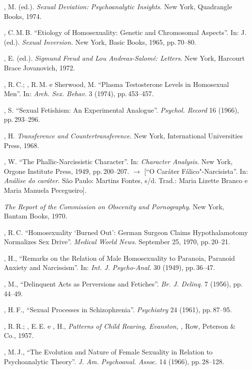 \begin{bibliohedra}
, M. (ed.). \textit{ Sexual Deviation: Psychoanalytic Insights. }New York,
Quadrangle Books, 1974.

, C.\,M.\,B. ``Etiology of Homosexuality: Genetic and
Chromosomal Aspects''. In:  J. (ed.). \textit{Sexual Inversion.} New York, 
Basic Books, 1965, pp.\,70--80.

, E. (ed.). \textit{Sigmund Freud and Lou Andreas-Salomé: Letters}. New
York, Harcourt Brace Jovanovich, 1972.

, R.\,C.; , R.\,M. e Sherwood, M. ``Plasma Testosterone
Levels in Homosexual Men''. In: \textit{Arch. Sex. Behav. }3 (1974), pp.\,453--457.

, S. ``Sexual Fetishism: An Experimental
Analogue''. \textit{Psychol. Record } 16 (1966), pp.\,293--296.

, H. \textit{Transference and Countertransference}. New York,
International Universities Press, 1968.

, W. ``The Phallic-Narcissistic Character''. In: \textit{Character 
Analysis}. New York, Orgone Institute Press, 1949, pp.\,200--207. {$\bm{\rightarrow}$} 
[``O Caráter Fálico"-Narcisista''. In: \textit{Análise do caráter}. São Paulo:
Martins Fontes, s/d. Trad.: Maria Lizette Branco e Maria Manuela Pecegueiro].

 \textit{The Report of the Commission on Obscenity and Pornography}. New York,
Bantam Books, 1970.

, R.\,C. ``Homosexuality `Burned
Out': German Surgeon Claims Hypothalamotomy Normalizes Sex
Drive''. \textit{Medical World News}. September 25, 1970, pp.\,20--21.

, H., ``Remarks on the Relation of Male Homosexuality to
Paranoia, Paranoid Anxiety and Narcissism''. In: \textit{Int. J.
Psycho-Anal.} 30 (1949), pp.\,36--47.

, M., ``Delinquent Acts as Perversions and
Fetiches''. \textit{Br. J. Delinq. }7 (1956), pp.\,44--49.

, H.\,F., ``Sexual Processes in
Schizophrenia''. \textit{Psychiatry }24 (1961), pp.\,87--95.

, R.\,R.; , E.\,E. e , H., \textit{Patterns 
of Child Rearing, Evanston, , }Row, Peterson \& Co., 1957.

, M.\,J., ``The Evolution and Nature of Female Sexuality in
Relation to Psychoanalytic Theory''. \textit{J. Am. Psychoanal.
Assoc. } 14 (1966), pp.\,28--128.


\end{bibliohedra}
